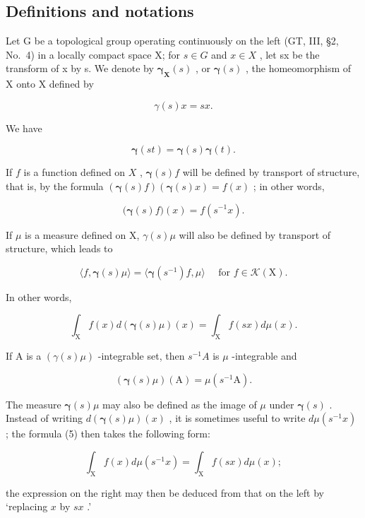 \subsection{Definitions and notations}

Let G be a topological group operating continuously on the left (GT, III, §2, No.~4) in a locally compact space X; for \(s \in G\) and \(x \in X\) , let sx be the transform of x by s. We denote by \(\boldsymbol{\gamma}_{\mathbf{X}}(s)\) , or \(\boldsymbol{\gamma}(s)\) , the homeomorphism of X onto X defined by

\[
\gamma (s) x = s x.\tag{1}
\]

We have

\[
\boldsymbol {\gamma} (s t) = \boldsymbol {\gamma} (s) \boldsymbol {\gamma} (t).\tag{2}
\]

If \(f\) is a function defined on \(X\) , \(\boldsymbol{\gamma}(s)f\) will be defined by transport of structure, that is, by the formula \((\boldsymbol{\gamma}(s)f)(\boldsymbol{\gamma}(s)x) = f(x)\) ; in other words,

\[
\big (\boldsymbol {\gamma} (s) f \big) (x) = f (s ^ {- 1} x).\tag{3}
\]

If \(\mu\) is a measure defined on X, \(\gamma(s)\mu\) will also be defined by transport of structure, which leads to

\[
\langle f, \boldsymbol {\gamma} (s) \mu \rangle = \langle \boldsymbol {\gamma} (s ^ {- 1}) f, \mu \rangle \quad \text {   for   } f \in \mathscr {K} (\mathrm{X}).\tag{4}
\]

In other words,

\[
\int_ {\mathrm{X}} f (x) d (\boldsymbol {\gamma} (s) \mu) (x) = \int_ {\mathrm{X}} f (s x) d \mu (x).\tag{5}
\]

If A is a \((\gamma(s)\mu)\) -integrable set, then \(s^{-1}A\) is \(\mu\) -integrable and

\[
\left(\boldsymbol {\gamma} (s) \mu\right) (\mathrm{A}) = \mu \left(s ^ {- 1} \mathrm{A}\right).\tag{6}
\]

The measure \(\boldsymbol{\gamma}(s)\mu\) may also be defined as the image of \(\mu\) under \(\boldsymbol{\gamma}(s)\) . Instead of writing \(d(\boldsymbol{\gamma}(s)\mu)(x)\) , it is sometimes useful to write \(d\mu(s^{-1}x)\) ; the formula (5) then takes the following form:

\[
\int_ {\mathrm{X}} f (x) d \mu (s ^ {- 1} x) = \int_ {\mathrm{X}} f (s x) d \mu (x);
\]

the expression on the right may then be deduced from that on the left by `replacing \(x\) by \(sx\) .'

